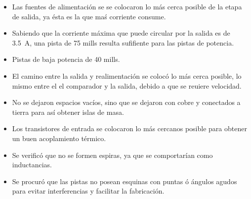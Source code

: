 \begin{itemize}
	\item Las fuentes de alimentación se se colocaron lo más cerca posible de la etapa de salida, ya ésta es la que maś corriente consume.
	\item Sabiendo que la corriente máxima que puede circular por la salida es de \SI{3.5}{\ampere}, una pista de 75 mills resulta sufifiente para las pistas de potencia.
	\item Pistas de baja potencia de 40 mills.
	\item El camino entre la salida y realimentación se colocó lo más cerca posible, lo mismo entre el el comparador y la salida, debido a que se reuiere velocidad. 
	\item No se dejaron espacios vacíos, sino que se dejaron con cobre y conectados a tierra para así obtener islas de masa.
	\item Los transistores de entrada se colocaron lo más cercanos posible para obtener un buen acoplamiento térmico.
	\item Se verificó que no se formen espiras, ya que se comportarían como inductancias.
	\item Se procuró que las pistas no posean esquinas con puntas ó ángulos agudos para evitar interferencias y facilitar la fabricación.

\end{itemize}
